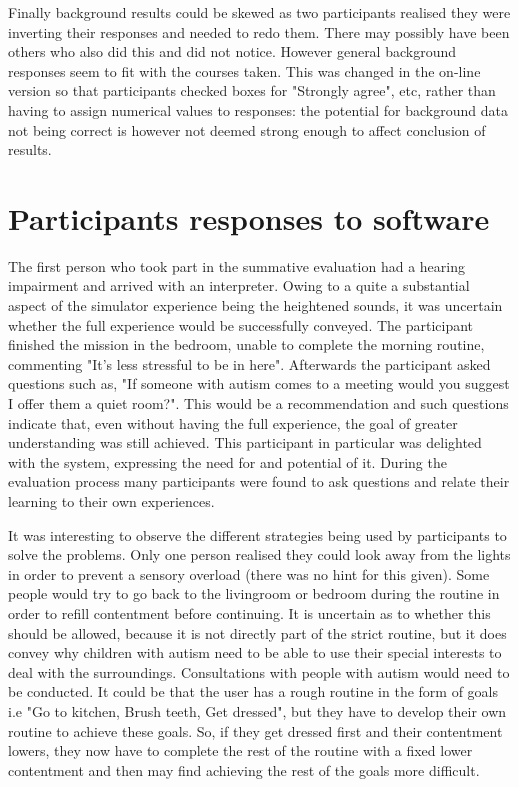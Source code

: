 \documentclass[11pt]{report}
\begin{document}
Finally background results could be skewed as two participants realised they were inverting their responses and needed to redo them. There may possibly have been others who also did this and did not notice. However general background responses seem to fit with the courses taken. This was changed in the on-line version so that participants checked boxes for "Strongly agree", etc, rather than having to assign numerical values to responses: the potential for background data not being correct is however not deemed strong enough to affect conclusion of results. 

\section{Participants responses to software}

The first person who took part in the summative evaluation had a hearing impairment and arrived with an interpreter. Owing to a quite a substantial aspect of the simulator experience being the heightened sounds, it was uncertain whether the full experience would be successfully conveyed. The participant finished the mission in the bedroom, unable to complete the morning routine, commenting "It's less stressful to be in here". Afterwards the participant asked questions such as, "If someone with autism comes to a meeting would you suggest I offer them a quiet room?". This would be a recommendation and such questions indicate that, even without having the full experience, the goal of greater understanding was still achieved. This participant in particular was delighted with the system, expressing the need for and potential of it. During the evaluation process many participants were found to ask questions and relate their learning to their own experiences.

It was interesting to observe the different strategies being used by participants to solve the problems. Only one person realised they could look away from the lights in order to prevent a sensory overload (there was no hint for this given). Some people would try to go back to the livingroom or bedroom during the routine in order to refill contentment before continuing. It is uncertain as to whether this should be allowed, because it is not directly part of the strict routine, but it does convey why children with autism need to be able to use their special interests to deal with the surroundings. Consultations with people with autism would need to be conducted. It could be that the user has a rough routine in the form of goals i.e "Go to kitchen, Brush teeth, Get dressed", but they have to develop their own routine to achieve these goals. So, if they get dressed first and their contentment lowers, they now have to complete the rest of the routine with a fixed lower contentment and then may find achieving the rest of the goals more difficult.
\end{document}
